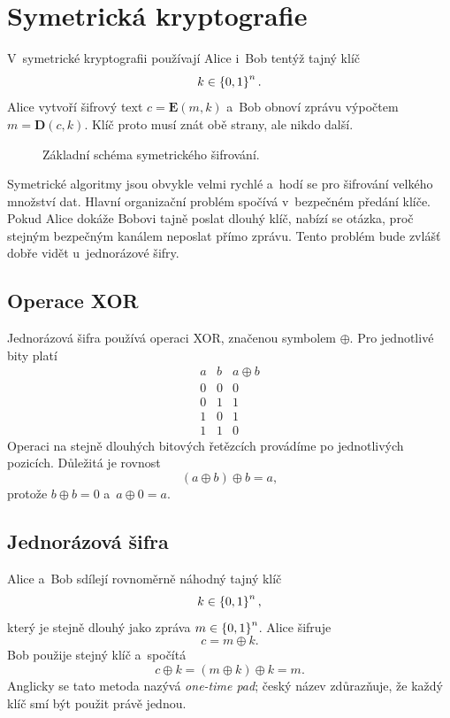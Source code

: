 \section{Symetrická kryptografie}\label{sec:krypto-symetricka}

V~symetrické kryptografii používají Alice i~Bob tentýž tajný klíč
\[
    k\in\left\{0,1\right\}^{n}.
\]
Alice vytvoří šifrový text $c=\mathbf{E}(m,k)$ a~Bob obnoví zprávu výpočtem $m=\mathbf{D}(c,k)$. Klíč proto musí znát obě strany, ale nikdo další.

\begin{figure}[ht]
    \centering
    
    \caption{Základní schéma symetrického šifrování.}
    \label{fig:krypto-symetricka}
\end{figure}

Symetrické algoritmy jsou obvykle velmi rychlé a~hodí se pro šifrování velkého množství dat. Hlavní organizační problém spočívá v~bezpečném předání klíče. Pokud Alice dokáže Bobovi tajně poslat dlouhý klíč, nabízí se otázka, proč stejným bezpečným kanálem neposlat přímo zprávu. Tento problém bude zvlášť dobře vidět u~jednorázové šifry.

\subsection{Operace XOR}

Jednorázová šifra používá operaci XOR, značenou symbolem $\oplus$. Pro jednotlivé bity platí
\[
\begin{array}{c|c|c}
    a & b & a\oplus b\\
    \hline
    0 & 0 & 0\\
    0 & 1 & 1\\
    1 & 0 & 1\\
    1 & 1 & 0
\end{array}
\]
Operaci na stejně dlouhých bitových řetězcích provádíme po jednotlivých pozicích. Důležitá je rovnost
\[
    (a\oplus b)\oplus b=a,
\]
protože $b\oplus b=0$ a~$a\oplus 0=a$.

\subsection{Jednorázová šifra}

Alice a~Bob sdílejí rovnoměrně náhodný tajný klíč
\[
    k\in\left\{0,1\right\}^{n},
\]
který je stejně dlouhý jako zpráva $m\in\left\{0,1\right\}^{n}$. Alice šifruje
\[
    c=m\oplus k.
\]
Bob použije stejný klíč a~spočítá
\[
    c\oplus k=(m\oplus k)\oplus k=m.
\]
Anglicky se tato metoda nazývá \emph{one-time pad}; český název zdůrazňuje, že každý klíč smí být použit právě jednou.

